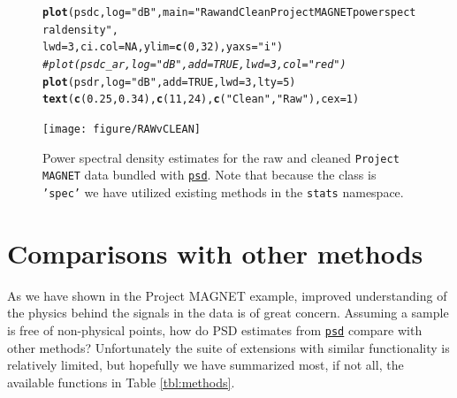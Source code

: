 \documentclass[10pt]{article}\usepackage[]{graphicx}\usepackage[]{color}
\makeatletter
\newcommand{\hlnum}[1]{\textcolor[rgb]{0.686,0.059,0.569}{#1}}%
\newcommand{\hlstr}[1]{\textcolor[rgb]{0.192,0.494,0.8}{#1}}%
\newcommand{\hlcom}[1]{\textcolor[rgb]{0.678,0.584,0.686}{\textit{#1}}}%
\newcommand{\hlstd}[1]{\textcolor[rgb]{0.345,0.345,0.345}{#1}}%
\newcommand{\hlkwc}[1]{\textcolor[rgb]{0.333,0.667,0.333}{#1}}%
\newcommand{\hlkwd}[1]{\textcolor[rgb]{0.737,0.353,0.396}{\textbf{#1}}}%
\newenvironment{kframe}{%
 \def\at@end@of@kframe{}%
 \ifinner\ifhmode%
  \def\at@end@of@kframe{\end{minipage}}%
  \begin{minipage}{\columnwidth}%
 \fi\fi%
 \def\FrameCommand##1{\hskip\@totalleftmargin \hskip-\fboxsep
 \colorbox{shadecolor}{##1}\hskip-\fboxsep
     \hskip-\linewidth \hskip-\@totalleftmargin \hskip\columnwidth}%
 \MakeFramed {\advance\hsize-\width
   \@totalleftmargin\z@ \linewidth\hsize
   \@setminipage}}%
 {\par\unskip\endMakeFramed%
 \at@end@of@kframe}
\newenvironment{knitrout}{}{} %
\newcommand{\Rcmd}[1]{\texttt{#1}}
\newcommand{\psd}[0]{\href{http://abarbour.github.com/psd/}{\color{blue}\Rcmd{psd}}}
\makeatother
\begin{document}
%
\begin{figure}[htb!]
\begin{center}
\begin{knitrout}
\color{fgcolor}\begin{kframe}
\begin{alltt}
\hlkwd{plot}\hlstd{(psdc,} \hlkwc{log}\hlstd{=}\hlstr{"dB"}\hlstd{,} \hlkwc{main}\hlstd{=}\hlstr{"Raw and Clean Project MAGNET power spectral density"}\hlstd{,}
       \hlkwc{lwd}\hlstd{=}\hlnum{3}\hlstd{,} \hlkwc{ci.col}\hlstd{=}\hlnum{NA}\hlstd{,} \hlkwc{ylim}\hlstd{=}\hlkwd{c}\hlstd{(}\hlnum{0}\hlstd{,}\hlnum{32}\hlstd{),} \hlkwc{yaxs}\hlstd{=}\hlstr{"i"}\hlstd{)}
\hlcom{#plot(psdc_ar, log="dB", add=TRUE, lwd=3, col="red")}
\hlkwd{plot}\hlstd{(psdr,} \hlkwc{log}\hlstd{=}\hlstr{"dB"}\hlstd{,} \hlkwc{add}\hlstd{=}\hlnum{TRUE}\hlstd{,} \hlkwc{lwd}\hlstd{=}\hlnum{3}\hlstd{,} \hlkwc{lty}\hlstd{=}\hlnum{5}\hlstd{)}
\hlkwd{text}\hlstd{(}\hlkwd{c}\hlstd{(}\hlnum{0.25}\hlstd{,}\hlnum{0.34}\hlstd{),} \hlkwd{c}\hlstd{(}\hlnum{11}\hlstd{,}\hlnum{24}\hlstd{),} \hlkwd{c}\hlstd{(}\hlstr{"Clean"}\hlstd{,}\hlstr{"Raw"}\hlstd{),} \hlkwc{cex}\hlstd{=}\hlnum{1}\hlstd{)}
\end{alltt}
\end{kframe}
\texttt{[image: figure/RAWvCLEAN]} 

\end{knitrout}
\caption{Power spectral density estimates for the raw and cleaned
             \Rcmd{Project MAGNET} data bundled with \psd{}. Note that
             because the class is \Rcmd{'spec'} we have
             utilized  existing methods in the \Rcmd{stats} namespace.}
\label{fig:pmag}
\end{center}
\end{figure}

\section{Comparisons with other methods}

As we have shown in the Project MAGNET example, 
improved understanding of the physics behind the signals in the data
is of great concern.
Assuming a sample is free of non-physical points, how do
PSD estimates from \psd{}
compare with other methods?
Unfortunately the suite of extensions with similar functionality
is relatively limited, but hopefully we have
summarized most, if not all, the available functions in Table \ref{tbl:methods}.
\end{document}

